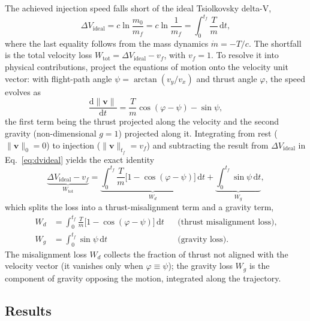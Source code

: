 \documentclass[../main.tex]{subfiles}
\begin{document}
The achieved injection speed falls short of the ideal Tsiolkovsky delta-V,
\begin{equation}
    \Delta V_\mathrm{ideal} = c\ln\!\frac{m_0}{m_f} = c\ln\!\frac{1}{m_f}
    = \int_0^{t_f}\!\frac{T}{m}\,\mathrm{d}t,
    \label{eq:dvideal}
\end{equation}
where the last equality follows from the mass dynamics $\dot{m} = -T/c$. The shortfall is the total velocity loss $W_\mathrm{tot} = \Delta V_\mathrm{ideal} - v_f$, with $v_f = 1$. To resolve it into physical contributions, project the equations of motion onto the velocity unit vector: with flight-path angle $\psi = \arctan(v_y/v_x)$ and thrust angle $\varphi$, the speed evolves as
\begin{equation}
    \frac{\mathrm{d}\lVert\mathbf{v}\rVert}{\mathrm{d}t}
    = \frac{T}{m}\cos(\varphi - \psi) - \sin\psi,
    \label{eq:speed_rate}
\end{equation}
the first term being the thrust projected along the velocity and the second gravity (non-dimensional $g = 1$) projected along it. Integrating from rest ($\lVert\mathbf{v}\rVert_0 = 0$) to injection ($\lVert\mathbf{v}\rVert_{t_f} = v_f$) and subtracting the result from $\Delta V_\mathrm{ideal}$ in Eq.~\eqref{eq:dvideal} yields the exact identity
\begin{equation}
    \underbrace{\Delta V_\mathrm{ideal} - v_f}_{W_\mathrm{tot}}
    = \underbrace{\int_0^{t_f}\!\frac{T}{m}\bigl[1 - \cos(\varphi - \psi)\bigr]\,\mathrm{d}t}_{W_d}
    + \underbrace{\int_0^{t_f}\!\sin\psi\,\mathrm{d}t}_{W_g},
    \label{eq:loss_split}
\end{equation}
which splits the loss into a thrust-misalignment term and a gravity term,
\begin{align}
    W_d &= \int_0^{t_f} \frac{T}{m}\bigl[1 - \cos(\varphi - \psi)\bigr]\,\mathrm{d}t
         && \text{(thrust misalignment loss)},
    \label{eq:Wd}\\
    W_g &= \int_0^{t_f} \sin\psi\,\mathrm{d}t
         && \text{(gravity loss)}.
    \label{eq:Wg}
\end{align}
The misalignment loss $W_d$ collects the fraction of thrust not aligned with the velocity vector (it vanishes only when $\varphi \equiv \psi$); the gravity loss $W_g$ is the component of gravity opposing the motion, integrated along the trajectory.

\subsection{Results}\label{sec:task1_results}
\end{document}
